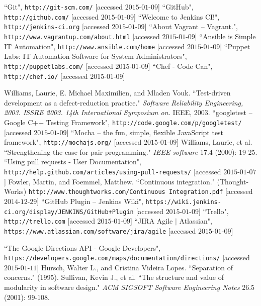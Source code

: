 \documentclass[a4paper, 10pt]{report}
\begin{document}
\begin{appendices}
\begin{thebibliography}{99}
``Git", \texttt{http://git-scm.com/} [accessed $\text{2015-01-09}$]
``GitHub", \texttt{http://github.com/} [accessed $\text{2015-01-09}$]
``Welcome to Jenkins CI!", \texttt{http://jenkins-ci.org} [accessed $\text{2015-01-09}$]
``About Vagrant -- Vagrant.", \texttt{http://www.vagrantup.com/about.html} [accessed $\text{2015-01-09}$]
``Ansible is Simple IT Automation", \texttt{http://www.ansible.com/home} [accessed $\text{2015-01-09}$]
``Puppet Labs: IT Automation Software for System Administrators", \texttt{http://puppetlabs.com/} [accessed $\text{2015-01-09}$]
``Chef - Code Can", \texttt{http://chef.io/} [accessed $\text{2015-01-09}$]

Williams, Laurie, E. Michael Maximilien, and Mladen Vouk. ``Test-driven development as a defect-reduction practice." \textit{Software Reliability Engineering, 2003. ISSRE 2003. 14th International Symposium on.} IEEE, 2003.
``googletest -- Google C++ Testing Framework", \texttt{http://code.google.com/p/googletest/} [accessed $\text{2015-01-09}$]
``Mocha -- the fun, simple, flexible JavaScript test framework",
\texttt{http://mochajs.org/} [accessed $\text{2015-01-09}$]
Williams, Laurie, et al. ``Strengthening the case for pair programming." \textit{IEEE software} 17.4 (2000): 19-25.
``Using pull requests - User Documentation", \\
\texttt{http://help.github.com/articles/using-pull-requests/} [accessed $\text{2015-01-07}$]
Fowler, Martin, and Foemmel, Matthew. ``Continuous integration." (Thought-Works) \texttt{http://www.thoughtworks.com/Continuous Integration.pdf} [accessed $\text{2014-12-29}$]
``GitHub Plugin -- Jenkins Wiki",
\texttt{https://wiki.jenkins-ci.org/display/JENKINS/GitHub+Plugin}
[accessed $\text{2015-01-09}$]
``Trello", \texttt{http://trello.com} [accessed $\text{2015-01-09}$]
``JIRA Agile $|$ Atlassian", 
\texttt{https://www.atlassian.com/software/jira/agile} [accessed $\text{2015-01-09}$]

``The Google Directions API - Google Developers", \\ \texttt{https://developers.google.com/maps/documentation/directions/} [accessed $\text{2015-01-11}$]
Hursch, Walter L., and Cristina Videira Lopes. ``Separation of concerns." (1995).
Sullivan, Kevin J., et al. ``The structure and value of modularity in software design." \textit{ACM SIGSOFT Software Engineering Notes} 26.5 (2001): 99-108.


\end{thebibliography}
\end{appendices}
\end{document}

